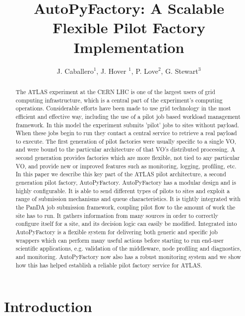 \documentclass[a4paper]{jpconf}
\begin{document}
\title{AutoPyFactory: A Scalable Flexible Pilot Factory Implementation}

\author{J. Caballero$^1$, J. Hover $^1$, P. Love$^2$, G. Stewart$^3$}

\address{$^1$ Brookhaven National Laboratory, PO BOX 5000 Upton, NY 11973, USA}
\address{$^2$ Department of Physics, Lancaster University, Lancaster, LA1 4YB, UK }
\address{$^3$ Department of Physics and Astronomy, University of Glasgow, Glasgow G12 8QQ, UK}


\begin{abstract}
The ATLAS experiment at the CERN LHC is one of the largest users of grid computing
infrastructure, which is a central part of the experiment's computing operations.
Considerable efforts have been made to use grid technology in the most efficient
and effective way, including the use of a pilot job based workload management framework.
In this model the experiment submits 'pilot' jobs to sites without payload. When these
jobs begin to run they contact a central service to retrieve a real payload to
execute. The first generation of pilot factories were usually specific to a
single VO, and were bound to the particular architecture of that VO's distributed processing. A 
second generation provides factories which are more flexible, not tied to any
particular VO, and provide new or improved features such as monitoring, logging, profiling, etc.
In this paper we describe this key part of the ATLAS pilot architecture, a second
generation pilot factory, AutoPyFactory.
AutoPyFactory has a modular design and is highly configurable. It is able to send
different types of pilots to sites and exploit a range of submission mechanisms
and queue characteristics. It is tightly integrated with the PanDA job submission framework,
coupling pilot flow to the amount of work the site has to run. It gathers information
from many sources in order to correctly configure itself for a site, and its decision logic
can easily be modified.
Integrated into AutoPyFactory is a flexible system for delivering both generic and
specific job wrappers which can perform many useful actions before starting to run
end-user scientific applications, e.g. validation of the middleware, node profiling
and diagnostics, and monitoring.
AutoPyFactory now also has a robust monitoring system and we show how this has helped
establish a reliable pilot factory service for ATLAS.
\end{abstract}


\section{Introduction}
\end{document}
